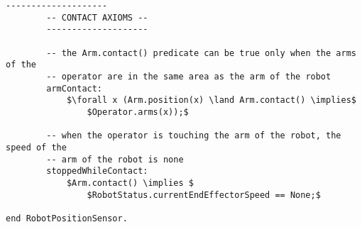 \begin{lstlisting}[fontadjust, mathescape, frame=single]
        --------------------
        -- CONTACT AXIOMS --
        --------------------

        -- the Arm.contact() predicate can be true only when the arms of the 
        -- operator are in the same area as the arm of the robot
        armContact:
            $\forall x (Arm.position(x) \land Arm.contact() \implies$
                $Operator.arms(x));$

        -- when the operator is touching the arm of the robot, the speed of the
        -- arm of the robot is none
        stoppedWhileContact:
            $Arm.contact() \implies $
                $RobotStatus.currentEndEffectorSpeed == None;$
        
end RobotPositionSensor.
\end{lstlisting}